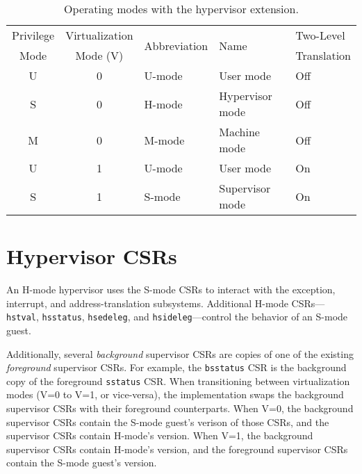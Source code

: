 \begin{table*}[h!]
\begin{center}
\begin{tabular}{|c|c||l|l|l|}
  \hline
   Privilege & Virtualization & \multirow{2}{*}{Abbreviation} & \multirow{2}{*}{Name} & Two-Level \\
   Mode      & Mode (V)       &                               &                       & Translation \\ \hline
   U         & 0              & U-mode  & User mode & Off \\
   S         & 0              & H-mode  & Hypervisor mode & Off \\
   M         & 0              & M-mode  & Machine mode & Off \\
   U         & 1              & U-mode  & User mode & On \\
   S         & 1              & S-mode  & Supervisor mode & On \\
  \hline
 \end{tabular}
\end{center}
\caption{Operating modes with the hypervisor extension.}
\label{h-operating-modes}
\end{table*}

\section{Hypervisor CSRs}

An H-mode hypervisor uses the S-mode CSRs to interact with the exception,
interrupt, and address-translation subsystems.
Additional H-mode CSRs---{\tt hstval}, {\tt hsstatus}, {\tt hsedeleg}, and
{\tt hsideleg}---control the behavior of an S-mode guest.

Additionally, several {\em background} supervisor CSRs are copies of one of
the existing {\em foreground} supervisor CSRs.  For example, the {\tt bsstatus}
CSR is the background copy of the foreground {\tt sstatus} CSR.  When
transitioning between virtualization modes (V=0 to V=1, or vice-versa), the
implementation swaps the background supervisor CSRs with their foreground
counterparts.  When V=0, the background supervisor CSRs contain the S-mode
guest's verison of those CSRs, and the supervisor CSRs contain H-mode's
version.  When V=1, the background supervisor CSRs contain H-mode's version,
and the foreground supervisor CSRs contain the S-mode guest's version.

%
%
%
%

